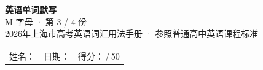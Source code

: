 \documentclass[10pt,a4paper]{article}
\begin{document}
\pagestyle{plain}

\begin{center}
{\LARGE\bfseries 英语单词默写}\\[0.22em]
{\large M 字母 · 第 3 / 4 份}\\[0.18em]
{\small 2026年上海市高考英语词汇用法手册 · 参照普通高中英语课程标准}
\end{center}

\vspace{0.25em}
\noindent\begin{tabular}{@{}p{}@{}p{}@{}p{}@{}}
姓名：\underline{\hspace{2.0cm}} & 日期：\underline{\hspace{2.0cm}} & 得分：\underline{\hspace{1.3cm}}\,/\,50 \\
\end{tabular}

\vspace{0.3em}

\vspace{0.08em}
\end{document}

